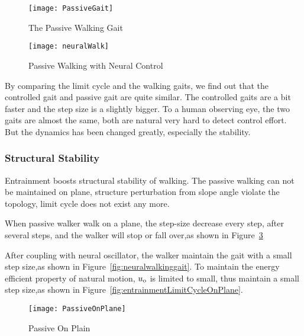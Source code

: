 \begin{figure}[!htbp]
  \begin{center}
     \texttt{[image: PassiveGait]}
    \caption{The Passive Walking Gait}
    \label{fig:passivegait}
\end{center}
\end{figure}

\begin{figure}[!htbp]
  \begin{center}
     \texttt{[image: neuralWalk]}
    \caption{Passive Walking with Neural Control}
    \label{fig:entrainmentgait}
\end{center}
\end{figure}

By comparing the limit cycle and the walking gaits, we find out that the controlled gait and passive gait are quite similar.
The controlled gaits are a bit faster and the step size is a slightly bigger.
To a human observing eye, the two gaits are almost the same, both are natural very hard to detect control effort.
But the dynamics has been changed greatly, especially the stability.



\subsubsection*{Structural Stability}
Entrainment  boosts structural stability of walking. 
The passive walking can not be maintained on plane, structure perturbation from slope angle violate the topology, limit cycle does not exist any more.


When passive walker walk on a plane,
the step-size decrease every step, after several steps, and the walker will stop or fall over,as shown in Figure~\ref{fig:passivegaitplane}

After coupling with neural oscillator, the  walker maintain the gait with a small step size,as shown in Figure~\ref{fig:neuralwalkinggait}.
To maintain the energy efficient property of natural motion, $u_{\mathrm{o}}$ is limited to small, thus maintain a small step size,as shown in Figure~\ref{fig:entrainmentLimitCycleOnPlane}.

\begin{figure}[!htbp]
  \begin{center}
    \texttt{[image: PassiveOnPlane]}
    \caption{Passive On Plain}
    \label{fig:passivegaitplane}
\end{center}
\end{figure}

